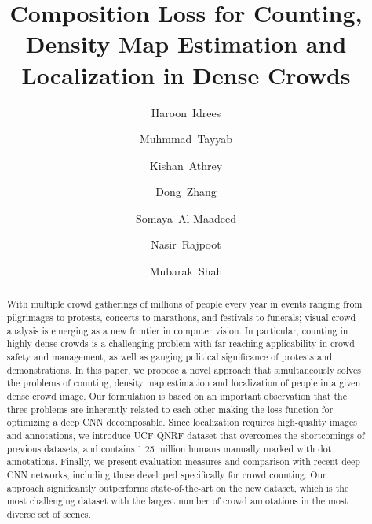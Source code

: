 \documentclass[runningheads]{llncs}
\newcommand{\etal}{\textit{et~al}. }
\begin{document}
\title{Composition Loss for Counting, Density Map Estimation and Localization in Dense Crowds}

\authorrunning{H. Idrees \etal}

\author{Haroon~Idrees \and Muhmmad~Tayyab \and Kishan~Athrey \and Dong~Zhang \and Somaya~Al-Maadeed \and Nasir~Rajpoot \and Mubarak~Shah}
\email{}

\maketitle

\begin{abstract}
With multiple crowd gatherings of millions of people every year in events ranging from pilgrimages to protests, concerts to marathons, and festivals to funerals; visual crowd analysis is emerging as a new frontier in computer vision. In particular, counting in highly dense crowds is a challenging problem with far-reaching applicability in crowd safety and management, as well as gauging political significance of protests and demonstrations. In this paper, we propose a novel approach that simultaneously solves the problems of counting, density map estimation and localization of people in a given dense crowd image. Our formulation is based on an important observation that the three problems are inherently related to each other making the loss function for optimizing a deep CNN decomposable. Since localization requires high-quality images and annotations, we introduce UCF-QNRF dataset that overcomes the shortcomings of previous datasets, and contains 1.25 million humans manually marked with dot annotations. Finally, we present evaluation measures and comparison with recent deep CNN networks, including those developed specifically for crowd counting. Our approach significantly outperforms state-of-the-art on the new dataset, which is the most challenging dataset with the largest number of crowd annotations in the most diverse set of scenes.


\end{abstract}
\end{document}
